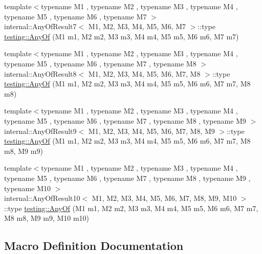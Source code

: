 \begin{DoxyCompactItemize}
\item 
{\footnotesize template$<$typename M1 , typename M2 , typename M3 , typename M4 , typename M5 , typename M6 , typename M7 $>$ }\\internal\+::\+Any\+Of\+Result7$<$ M1, M2, M3, M4, M5, M6, M7 $>$\+::type \hyperlink{namespacetesting_a754d1bddb237e79613f6834af3329efa}{testing\+::\+Any\+Of} (M1 m1, M2 m2, M3 m3, M4 m4, M5 m5, M6 m6, M7 m7)
\item 
{\footnotesize template$<$typename M1 , typename M2 , typename M3 , typename M4 , typename M5 , typename M6 , typename M7 , typename M8 $>$ }\\internal\+::\+Any\+Of\+Result8$<$ M1, M2, M3, M4, M5, M6, M7, M8 $>$\+::type \hyperlink{namespacetesting_a9c979c62cc004664b14e0ce444e531d5}{testing\+::\+Any\+Of} (M1 m1, M2 m2, M3 m3, M4 m4, M5 m5, M6 m6, M7 m7, M8 m8)
\item 
{\footnotesize template$<$typename M1 , typename M2 , typename M3 , typename M4 , typename M5 , typename M6 , typename M7 , typename M8 , typename M9 $>$ }\\internal\+::\+Any\+Of\+Result9$<$ M1, M2, M3, M4, M5, M6, M7, M8, M9 $>$\+::type \hyperlink{namespacetesting_a873c812db953aebd4bf2ffbff0e8d770}{testing\+::\+Any\+Of} (M1 m1, M2 m2, M3 m3, M4 m4, M5 m5, M6 m6, M7 m7, M8 m8, M9 m9)
\item 
{\footnotesize template$<$typename M1 , typename M2 , typename M3 , typename M4 , typename M5 , typename M6 , typename M7 , typename M8 , typename M9 , typename M10 $>$ }\\internal\+::\+Any\+Of\+Result10$<$ M1, M2, M3, M4, M5, M6, M7, M8, M9, M10 $>$\+::type \hyperlink{namespacetesting_a1797921d3ed04c7f13dfa8f36bf0bf1c}{testing\+::\+Any\+Of} (M1 m1, M2 m2, M3 m3, M4 m4, M5 m5, M6 m6, M7 m7, M8 m8, M9 m9, M10 m10)
\end{DoxyCompactItemize}


\subsection{Macro Definition Documentation}
\mbox{\label{gmock-generated-matchers_8h_acf3e27de83a73f0d873da1cd471e505b}} 
